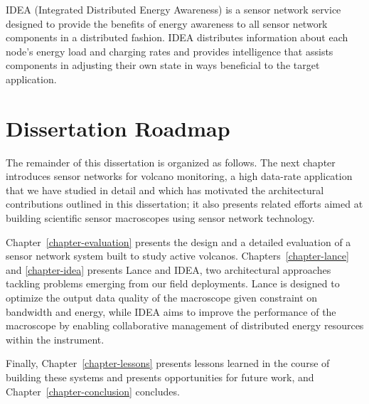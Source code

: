 \begin{itemize}
IDEA (Integrated Distributed Energy Awareness) is a sensor network service
designed to provide the benefits of energy awareness to all sensor network
components in a distributed fashion. IDEA distributes information about each
node's energy load and charging rates and provides intelligence that assists
components in adjusting their own state in ways beneficial to the target
application.

\end{itemize}

\section{Dissertation Roadmap}

The remainder of this dissertation is organized as follows. The next chapter
introduces sensor networks for volcano monitoring, a high data-rate
application that we have studied in detail and which has motivated the
architectural contributions outlined in this dissertation; it also presents
related efforts aimed at building scientific sensor macroscopes using sensor
network technology.

Chapter~\ref{chapter-evaluation} presents the design and a detailed
evaluation of a sensor network system built to study active volcanos.
Chapters~\ref{chapter-lance} and \ref{chapter-idea} presents Lance and IDEA,
two architectural approaches tackling problems emerging from our field
deployments. Lance is designed to optimize the output data quality of the
macroscope given constraint on bandwidth and energy, while IDEA aims to
improve the performance of the macroscope by enabling collaborative
management of distributed energy resources within the instrument.

Finally, Chapter~\ref{chapter-lessons} presents lessons learned in the course
of building these systems and presents opportunities for future work, and
Chapter~\ref{chapter-conclusion} concludes.

